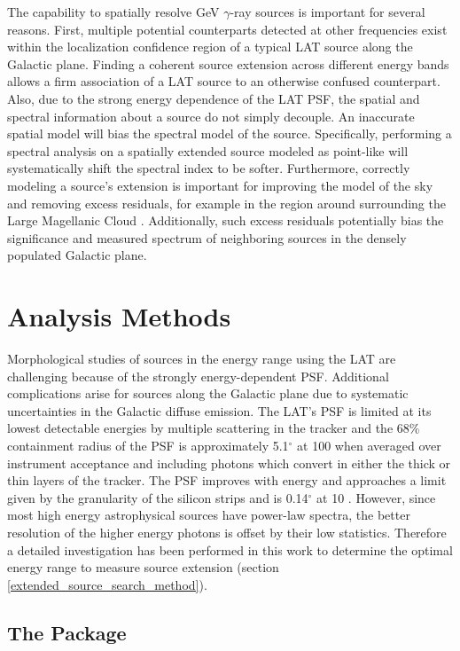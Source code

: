 \documentclass[12pt,preprint]{aastex}
\newcommand{\mev}{\text{MeV}\xspace}
\newcommand{\gev}{\text{GeV}\xspace}
\renewcommand{\deg}{\ensuremath{^\circ}\xspace}
\newcommand{\pointlike}{\text{\em pointlike}\xspace}
\begin{document}
The capability to
spatially resolve GeV $\gamma$-ray sources is
important for several reasons. 
First, multiple potential counterparts detected at other frequencies
exist within the localization confidence region of a typical LAT source
along the Galactic plane.
Finding a coherent
source extension across different energy bands allows a firm association
of a LAT source to an otherwise confused counterpart.  Also, due
to the strong energy dependence of the LAT PSF,
the spatial and spectral information
about a source do not simply decouple. An inaccurate spatial model will bias
the spectral model of the source. Specifically, performing a spectral
analysis on a spatially extended source modeled as point-like will
systematically shift the spectral index to be softer.  Furthermore,
correctly modeling a source's extension is important for improving
the model of the sky and removing excess residuals, for example in the
region around surrounding the Large Magellanic Cloud \citep{first_cat}.
Additionally, such excess residuals potentially bias the significance
and measured spectrum of neighboring sources in the densely populated
Galactic plane.

\section{Analysis Methods}

Morphological studies of sources in the \gev energy range using the
LAT are challenging because of the strongly energy-dependent PSF.
Additional complications arise for sources along the Galactic plane due to
systematic uncertainties in the Galactic diffuse emission.  The LAT's
PSF is limited at its lowest detectable energies by multiple scattering in the tracker
and the 68\% containment radius of the PSF is approximately 5.1\deg
at 100 \mev  when averaged over instrument acceptance and including
photons which convert in either the thick or thin layers of the
tracker. The PSF improves with energy and approaches a limit given
by the granularity of the silicon strips and is 0.14\deg at 10 \gev
\citep{on_orbit_calibration}.  However, since most high energy
astrophysical sources have power-law spectra, the better resolution of the higher
energy photons is offset by their low
statistics. Therefore a detailed investigation has been performed in this
work to determine the optimal energy range to measure source extension
(section \ref{extended_source_search_method}).

\subsection{The \pointlike Package}
\end{document}
